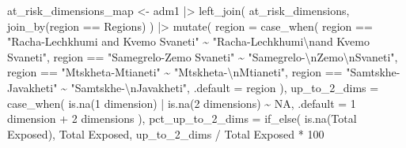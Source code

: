 \documentclass[
  letterpaper,
  DIV=11,
  numbers=noendperiod]{scrartcl}
\newenvironment{Shaded}{}{}
\newcommand{\AttributeTok}[1]{\textcolor[rgb]{0.84,0.23,0.29}{#1}}
\newcommand{\ConstantTok}[1]{\textcolor[rgb]{0.00,0.36,0.77}{#1}}
\newcommand{\DecValTok}[1]{\textcolor[rgb]{0.00,0.36,0.77}{#1}}
\newcommand{\FunctionTok}[1]{\textcolor[rgb]{0.44,0.26,0.76}{#1}}
\newcommand{\NormalTok}[1]{\textcolor[rgb]{0.14,0.16,0.18}{#1}}
\newcommand{\OtherTok}[1]{\textcolor[rgb]{0.44,0.26,0.76}{#1}}
\newcommand{\SpecialCharTok}[1]{\textcolor[rgb]{0.00,0.36,0.77}{#1}}
\newcommand{\StringTok}[1]{\textcolor[rgb]{0.01,0.18,0.38}{#1}}
\begin{document}
\begin{Shaded}
\begin{Highlighting}[]
\NormalTok{at\_risk\_dimensions\_map }\OtherTok{\textless{}{-}}\NormalTok{ adm1 }\SpecialCharTok{|\textgreater{}} 
  \FunctionTok{left\_join}\NormalTok{(}
\NormalTok{    at\_risk\_dimensions,}
    \FunctionTok{join\_by}\NormalTok{(region }\SpecialCharTok{==}\NormalTok{ Regions)}
\NormalTok{  ) }\SpecialCharTok{|\textgreater{}} 
  \FunctionTok{mutate}\NormalTok{(}
    \AttributeTok{region =} \FunctionTok{case\_when}\NormalTok{(}
\NormalTok{      region }\SpecialCharTok{==} \StringTok{"Racha{-}Lechkhumi and Kvemo Svaneti"} \SpecialCharTok{\textasciitilde{}}
      \StringTok{"Racha{-}Lechkhumi}\SpecialCharTok{\textbackslash{}n}\StringTok{and Kvemo Svaneti"}\NormalTok{,}
\NormalTok{      region }\SpecialCharTok{==} \StringTok{"Samegrelo{-}Zemo Svaneti"} \SpecialCharTok{\textasciitilde{}}
      \StringTok{"Samegrelo{-}}\SpecialCharTok{\textbackslash{}n}\StringTok{Zemo}\SpecialCharTok{\textbackslash{}n}\StringTok{Svaneti"}\NormalTok{,}
\NormalTok{      region }\SpecialCharTok{==} \StringTok{"Mtskheta{-}Mtianeti"} \SpecialCharTok{\textasciitilde{}}
      \StringTok{"Mtskheta{-}}\SpecialCharTok{\textbackslash{}n}\StringTok{Mtianeti"}\NormalTok{,}
\NormalTok{      region }\SpecialCharTok{==} \StringTok{"Samtskhe{-}Javakheti"} \SpecialCharTok{\textasciitilde{}}
      \StringTok{"Samtskhe{-}}\SpecialCharTok{\textbackslash{}n}\StringTok{Javakheti"}\NormalTok{,}
      \AttributeTok{.default =}\NormalTok{ region}
\NormalTok{    ),}
    \AttributeTok{up\_to\_2\_dims =} \FunctionTok{case\_when}\NormalTok{(}
      \FunctionTok{is.na}\NormalTok{(}\StringTok{\textasciigrave{}}\AttributeTok{1 dimension}\StringTok{\textasciigrave{}}\NormalTok{) }\SpecialCharTok{|} \FunctionTok{is.na}\NormalTok{(}\StringTok{\textasciigrave{}}\AttributeTok{2 dimensions}\StringTok{\textasciigrave{}}\NormalTok{) }\SpecialCharTok{\textasciitilde{}} \ConstantTok{NA}\NormalTok{,}
      \AttributeTok{.default =} \StringTok{\textasciigrave{}}\AttributeTok{1 dimension}\StringTok{\textasciigrave{}} \SpecialCharTok{+} \StringTok{\textasciigrave{}}\AttributeTok{2 dimensions}\StringTok{\textasciigrave{}}
\NormalTok{    ),}
    \AttributeTok{pct\_up\_to\_2\_dims =} \FunctionTok{if\_else}\NormalTok{(}
      \FunctionTok{is.na}\NormalTok{(}\StringTok{\textasciigrave{}}\AttributeTok{Total Exposed}\StringTok{\textasciigrave{}}\NormalTok{), }\StringTok{\textasciigrave{}}\AttributeTok{Total Exposed}\StringTok{\textasciigrave{}}\NormalTok{,}
\NormalTok{      up\_to\_2\_dims }\SpecialCharTok{/} \StringTok{\textasciigrave{}}\AttributeTok{Total Exposed}\StringTok{\textasciigrave{}} \SpecialCharTok{*} \DecValTok{100}

\end{Highlighting}
\end{Shaded}
\end{document}
